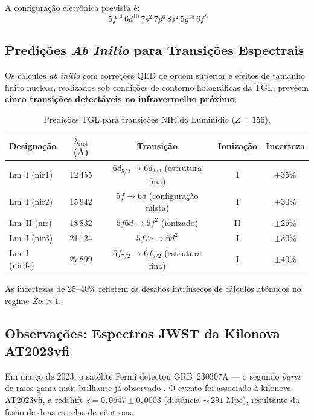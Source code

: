 \documentclass[12pt,a4paper,twoside]{article}
\begin{document}
A configura\c{c}\~ao eletr\^onica prevista \'e:
\begin{equation}
[\text{Og}]\; 5f^{14}\, 6d^{10}\, 7s^2\, 7p^6\, 8s^2\, 5g^{18}\, 6f^8
\label{eq:lm_config}
\end{equation}

\subsection{Predi\c{c}\~oes \textit{Ab Initio} para Transi\c{c}\~oes Espectrais}

Os c\'alculos \textit{ab initio} com corre\c{c}\~oes QED de ordem superior e efeitos de tamanho finito nuclear, realizados sob condi\c{c}\~oes de contorno hologr\'aficas da TGL, prev\^eem \textbf{cinco transi\c{c}\~oes detect\'aveis no infravermelho pr\'oximo}:

\begin{table}[H]
\centering
\caption{Predi\c{c}\~oes TGL para transi\c{c}\~oes NIR do Lumin\'idio ($Z = 156$).}
\label{tab:lm_predictions}
\begin{tabular}{lcccc}
\toprule
\textbf{Designa\c{c}\~ao} & $\lambda_{\text{rest}}$ (\AA) & \textbf{Transi\c{c}\~ao} & \textbf{Ioniza\c{c}\~ao} & \textbf{Incerteza} \\
\midrule
Lm~I (nir1) & 12\,455 & $6d_{5/2} \to 6d_{3/2}$ (estrutura fina) & I & $\pm 35\%$ \\
Lm~I (nir2) & 15\,942 & $5f \to 6d$ (configura\c{c}\~ao mista) & I & $\pm 30\%$ \\
Lm~II (nir) & 18\,832 & $5f6d \to 5f^2$ (ionizado) & II & $\pm 25\%$ \\
Lm~I (nir3) & 21\,124 & $5f7s \to 6d^2$ & I & $\pm 30\%$ \\
Lm~I (nir,fs) & 27\,899 & $6f_{7/2} \to 6f_{5/2}$ (estrutura fina) & I & $\pm 40\%$ \\
\bottomrule
\end{tabular}
\end{table}

\noindent As incertezas de 25--40\% refletem os desafios intr\'insecos de c\'alculos at\^omicos no regime $Z\alpha > 1$.



\subsection{Observa\c{c}\~oes: Espectros JWST da Kilonova AT2023vfi}

Em mar\c{c}o de 2023, o sat\'elite Fermi detectou GRB~230307A --- o segundo \textit{burst} de raios gama mais brilhante j\'a observado \cite{Levan2024}. O evento foi associado \`a kilonova AT2023vfi, a redshift $z = 0{,}0647 \pm 0{,}0003$ (dist\^ancia ${\sim}\,291$ Mpc), resultante da fus\~ao de duas estrelas de n\^eutrons.
\end{document}
